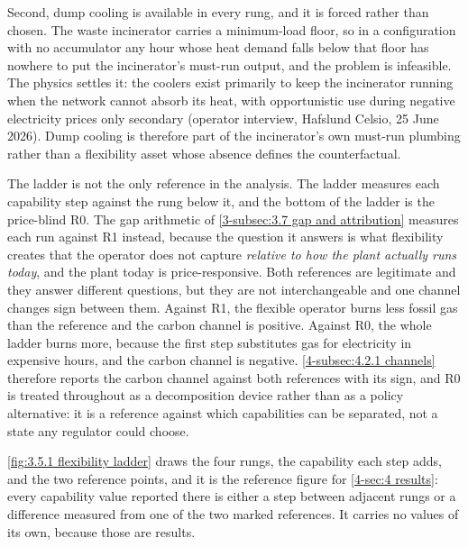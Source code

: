 Second, dump cooling is available in every rung, and it is forced rather than chosen. The waste incinerator carries a minimum-load floor, so in a configuration with no accumulator any hour whose heat demand falls below that floor has nowhere to put the incinerator's must-run output, and the problem is infeasible. The physics settles it: the coolers exist primarily to keep the incinerator running when the network cannot absorb its heat, with opportunistic use during negative electricity prices only secondary (operator interview, Hafslund Celsio, 25 June 2026). Dump cooling is therefore part of the incinerator's own must-run plumbing rather than a flexibility asset whose absence defines the counterfactual.

The ladder is not the only reference in the analysis. The ladder measures each capability step against the rung below it, and the bottom of the ladder is the price-blind R0. The gap arithmetic of \autoref{3-subsec:3.7 gap and attribution} measures each run against R1 instead, because the question it answers is what flexibility creates that the operator does not capture \emph{relative to how the plant actually runs today}, and the plant today is price-responsive. Both references are legitimate and they answer different questions, but they are not interchangeable and one channel changes sign between them. Against R1, the flexible operator burns less fossil gas than the reference and the carbon channel is positive. Against R0, the whole ladder burns more, because the first step substitutes gas for electricity in expensive hours, and the carbon channel is negative. \autoref{4-subsec:4.2.1 channels} therefore reports the carbon channel against both references with its sign, and R0 is treated throughout as a decomposition device rather than as a policy alternative: it is a reference against which capabilities can be separated, not a state any regulator could choose.

\autoref{fig:3.5.1 flexibility ladder} draws the four rungs, the capability each step adds, and the two reference points, and it is the reference figure for \autoref{4-sec:4 results}: every capability value reported there is either a step between adjacent rungs or a difference measured from one of the two marked references. It carries no values of its own, because those are results.

